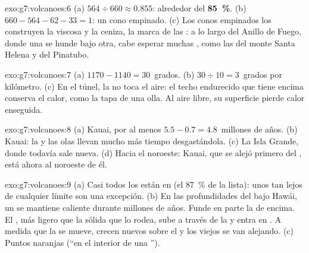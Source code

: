 \begin{solution}{exo:g7:volcanoes:6}
(a) $564 \div 660 \approx 0.855$: alrededor del \textbf{85~\%}. (b)
$660 - 564 - 62 - 33 = 1$: un cono empinado. (c) Los conos empinados los
construyen la  viscosa y la ceniza, la marca de las : a lo largo del Anillo de Fuego, donde una  se hunde bajo
otra, cabe esperar muchas , como las del monte Santa
Helena y del Pinatubo.
\end{solution}

\begin{solution}{exo:g7:volcanoes:7}
(a) $1170 - 1140 = 30$~grados. (b) $30 \div 10 = 3$~grados por kilómetro.
(c) En el túnel, la  no toca el aire: el techo endurecido que tiene
encima conserva el calor, como la tapa de una olla. Al aire libre, su
superficie pierde calor enseguida.
\end{solution}

\begin{solution}{exo:g7:volcanoes:8}
(a) Kauai, por al menos $5.5 - 0.7 = 4.8$~millones de años. (b) Kauai: la
 y las olas llevan mucho más tiempo desgastándola. (c) La Isla
Grande, donde todavía sale  nueva. (d) Hacia el noroeste: Kauai, que se
alejó primero del , está ahora al noroeste de él.
\end{solution}

\begin{solution}{exo:g7:volcanoes:9}
(a) Casi todos los  están en  (el 87~\% de la
lista): unos  tan lejos de cualquier límite son una excepción.
(b) En las profundidades del  bajo Hawái, un  se
mantiene caliente durante millones de años. Funde en parte la  de
encima. El , más ligero que la  sólida que lo rodea, sube a través
de la  y entra en . A medida que la  se mueve, crecen
 nuevos sobre el  y los viejos se van alejando. (c)
Puntos naranjas (``en el interior de una '').
\end{solution}

